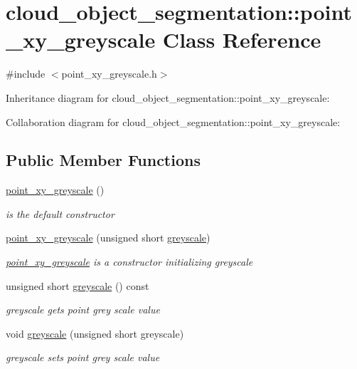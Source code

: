 \hypertarget{classcloud__object__segmentation_1_1point__xy__greyscale}{}\section{cloud\+\_\+object\+\_\+segmentation\+:\+:point\+\_\+xy\+\_\+greyscale Class Reference}
\label{classcloud__object__segmentation_1_1point__xy__greyscale}


{\ttfamily \#include $<$point\+\_\+xy\+\_\+greyscale.\+h$>$}



Inheritance diagram for cloud\+\_\+object\+\_\+segmentation\+:\+:point\+\_\+xy\+\_\+greyscale\+:


Collaboration diagram for cloud\+\_\+object\+\_\+segmentation\+:\+:point\+\_\+xy\+\_\+greyscale\+:
\subsection*{Public Member Functions}
\begin{DoxyCompactItemize}
\item 
\hyperlink{classcloud__object__segmentation_1_1point__xy__greyscale_a5bf6379c78a4a4e29b2750cbef78da5e}{point\+\_\+xy\+\_\+greyscale} ()
\begin{DoxyCompactList}\small\item\em is the default constructor \end{DoxyCompactList}\item 
\hyperlink{classcloud__object__segmentation_1_1point__xy__greyscale_a8dcdf7bbce0b8dd5ee3bdd4df0500c2b}{point\+\_\+xy\+\_\+greyscale} (unsigned short \hyperlink{classcloud__object__segmentation_1_1point__xy__greyscale_a4bf134f4895bac03b4dee926bdde7af3}{greyscale})
\begin{DoxyCompactList}\small\item\em \hyperlink{classcloud__object__segmentation_1_1point__xy__greyscale}{point\+\_\+xy\+\_\+greyscale} is a constructor initializing greyscale \end{DoxyCompactList}\item 
unsigned short \hyperlink{classcloud__object__segmentation_1_1point__xy__greyscale_a4bf134f4895bac03b4dee926bdde7af3}{greyscale} () const 
\begin{DoxyCompactList}\small\item\em greyscale gets point grey scale value \end{DoxyCompactList}\item 
void \hyperlink{classcloud__object__segmentation_1_1point__xy__greyscale_a014820445c8bb1761bb893f66800ebe1}{greyscale} (unsigned short greyscale)
\begin{DoxyCompactList}\small\item\em greyscale sets point grey scale value \end{DoxyCompactList}\end{DoxyCompactItemize}


